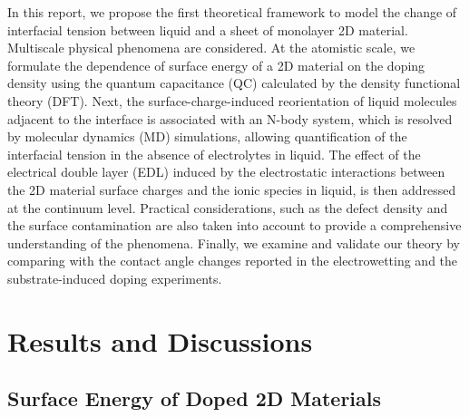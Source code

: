 \documentclass[journal=jacsat,manuscript=article,email=true]{achemso}
\begin{document}
In this report, we propose the first theoretical framework to model
the change of interfacial tension between liquid and a sheet of
monolayer 2D material. Multiscale physical phenomena are
considered. At the atomistic scale, we formulate the dependence of
surface energy of a 2D material on the doping density using the
quantum capacitance (QC) calculated by the density functional theory
(DFT). Next, the surface-charge-induced reorientation of liquid
molecules adjacent to the interface is associated with an N-body
system, which is resolved by molecular dynamics (MD) simulations,
allowing quantification of the interfacial tension in the absence of
electrolytes in liquid. The effect of the electrical double layer
(EDL) induced by the electrostatic interactions between the 2D
material surface charges and the ionic species in liquid, is then
addressed at the continuum level. Practical considerations, such as
the defect density and the surface contamination are also taken into
account to provide a comprehensive understanding of the
phenomena. Finally, we examine and validate our theory by comparing
with the contact angle changes reported in the electrowetting and the
substrate-induced doping experiments.

\section{Results and Discussions}
\label{sec:org66b0b42}

\subsection{Surface Energy of Doped 2D Materials}
\label{sec:org87cc68c}
\end{document}
